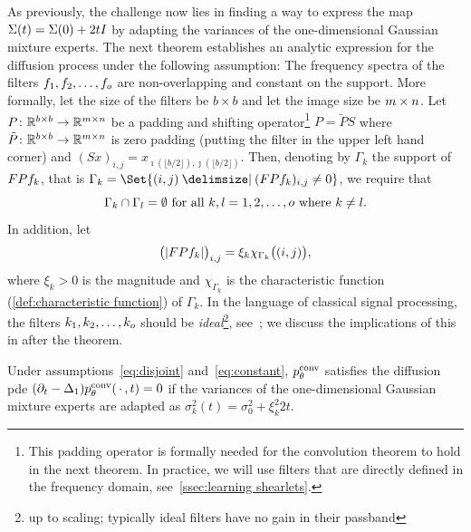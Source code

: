 As previously, the challenge now lies in finding a way to express the map \( \Sigma(t) = \Sigma(\num{0}) + \num{2}tI \) by adapting the variances of the one-dimensional Gaussian mixture experts.
The next theorem establishes an analytic expression for the diffusion process under the following assumption:
The frequency spectra of the filters \( f_{\num{1}}, f_{\num{2}}, \dotsc, f_o \) are non-overlapping and constant on the support.
More formally, let the size of the filters be \( b \times b \) and let the image size be \( m \times n \).
Let \( P \colon \mathbb{R}^{b\times b} \to \mathbb{R}^{m \times n} \) be a padding and shifting operator\footnote{%
	This padding operator is formally needed for the convolution theorem to hold in the next theorem.
	In practice, we will use filters that are directly defined in the frequency domain, see~\cref{ssec:learning shearlets}.
}
\( P = \tilde{P} S \) where \( \tilde{P} \colon \mathbb{R}^{b\times b} \to \mathbb{R}^{m\times n} \) is zero padding (putting the filter in the upper left hand corner) and \( (Sx)_{i, j} = x_{\imath(\lfloor b /\num{2}\rfloor), \jmath(\lfloor b/\num{2} \rfloor)} \).
Then, denoting by \( \Gamma_k \) the support of \( F P f_k \), that is \( \Gamma_k = \Set{(i, j) \given (\Fourier P \Filter_k)_{i, j} \neq \num{0}} \), we require that
\begin{equation}
	\Gamma_k \cap \Gamma_l = \emptyset\ \text{for all}\ k,l=\num{1},\num{2},\dotsc,\NumExperts\ \text{where}\ k \neq l.
	\label{eq:disjoint}
\end{equation}
In addition, let
\begin{equation}
	\bigl(|F P f_k|\bigr)_{i, j} = \xi_k \chi_{\Gamma_k}\bigl((i, j)\bigr),
	\label{eq:constant}
\end{equation}
where \( \xi_k > \num{0} \) is the magnitude and \( \chi_{\Gamma_k} \) is the characteristic function (\cref{def:characteristic function}) of \( \Gamma_k \).
In the language of classical signal processing, the filters \( k_{\num{1}}, k_{\num{2}}, \dotsc, k_o \) should be \emph{ideal}\footnote{up to scaling; typically ideal filters have no gain in their passband}, see~\cite[fig. 2.17, fig. 2.18]{oppenheim2009discrete};
we discuss the implications of this in after the theorem.
\begin{theorem}
	Under assumptions~\eqref{eq:disjoint} and~\eqref{eq:constant}, \( p^{\mathrm{conv}}_\theta \) satisfies the diffusion \gls{pde} \( (\partial_t - \Delta_{\num{1}}) p^{\mathrm{conv}}_\theta(\,\cdot\,, t) = \num{0} \) if the variances of the one-dimensional Gaussian mixture experts are adapted as \( \sigma_k^{\num{2}}(t) = \sigma_{\num{0}}^{\num{2}} + \xi_k^{\num{2}} \num{2}t \).
	\label{th:overcomplete diffusion}
\end{theorem}
